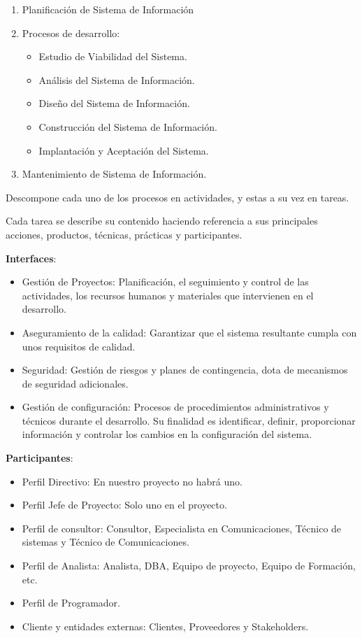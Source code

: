 \documentclass[12pt]{report} %
\begin{document}
\begin{enumerate}
\def\labelenumi{\arabic{enumi}.}

\item
  Planificación de Sistema de Información
\item
  Procesos de desarrollo:

  \begin{itemize}
  
  \item
    Estudio de Viabilidad del Sistema.
  \item
    Análisis del Sistema de Información.
  \item
    Diseño del Sistema de Información.
  \item
    Construcción del Sistema de Información.
  \item
    Implantación y Aceptación del Sistema.
  \end{itemize}
\item
  Mantenimiento de Sistema de Información.
\end{enumerate}

Descompone cada uno de los procesos en actividades, y estas a su vez en
tareas.

Cada tarea se describe su contenido haciendo referencia a sus
principales acciones, productos, técnicas, prácticas y participantes.

\textbf{Interfaces}:

\begin{itemize}

\item
  Gestión de Proyectos: Planificación, el seguimiento y control de las
  actividades, los recursos humanos y materiales que intervienen en el
  desarrollo.
\item
  Aseguramiento de la calidad: Garantizar que el sistema resultante
  cumpla con unos requisitos de calidad.
\item
  Seguridad: Gestión de riesgos y planes de contingencia, dota de
  mecanismos de seguridad adicionales.
\item
  Gestión de configuración: Procesos de procedimientos administrativos y
  técnicos durante el desarrollo. Su finalidad es identificar, definir,
  proporcionar información y controlar los cambios en la configuración
  del sistema.
\end{itemize}

\textbf{Participantes}:

\begin{itemize}

\item
  Perfil Directivo: En nuestro proyecto no habrá uno.
\item
  Perfil Jefe de Proyecto: Solo uno en el proyecto.
\item
  Perfil de consultor: Consultor, Especialista en Comunicaciones,
  Técnico de sistemas y Técnico de Comunicaciones.
\item
  Perfil de Analista: Analista, DBA, Equipo de proyecto, Equipo de
  Formación, etc.
\item
  Perfil de Programador.
\item
  Cliente y entidades externas: Clientes, Proveedores y Stakeholders.
\end{itemize}
\end{document}

